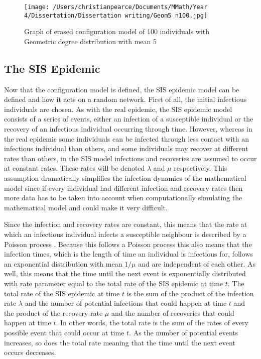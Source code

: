 \documentclass{uonmathsreport}
\begin{document}
\begin{figure}
\begin{center}
\texttt{[image: /Users/christianpearce/Documents/MMath/Year 4/Dissertation/Dissertation writing/Geom5 n100.jpg]}
\end{center}
\caption{Graph of erased configuration model of 100 individuals with Geometric degree distribution with mean 5}
\label{Geom5 n100}
\end{figure}

\subsection{The SIS Epidemic} \label{subsub:5.2}

Now that the configuration model is defined, the SIS epidemic model can be defined and how it acts on a random network. First of all, the initial infectious individuals are chosen. As with the real epidemic, the SIS epidemic model consists of a series of events, either an infection of a susceptible individual or the recovery of an infectious individual occurring through time. However, whereas in the real epidemic some individuals can be infected through less contact with an infectious individual than others, and some individuals may recover at different rates than others, in the SIS model infections and recoveries are assumed to occur at constant rates. These rates will be denoted $\lambda$ and $\mu$ respectively. This assumption dramatically simplifies the infection dynamics of the mathematical model since if every individual had different infection and recovery rates then more data has to be taken into account when computationally simulating the mathematical model and could make it very difficult.

Since the infection and recovery rates are constant, this means that the rate at which an infectious individual infects a susceptible neighbour is described by a Poisson process \cite{bibandersson3}. Because this follows a Poisson process this also means that the infection times, which is the length of time an individual is infectious for, follows an exponential distribution with mean $1/ \mu$ and are independent of each other. As well, this means that the time until the next event is exponentially distributed with rate parameter equal to the total rate of the SIS epidemic at time $t$. The total rate of the SIS epidemic at time $t$ is the sum of the product of the infection rate $\lambda$ and the number of potential infections that could happen at time $t$ and the product of the recovery rate $\mu$ and the number of recoveries that could happen at time $t$. In other words, the total rate is the sum of the rates of every possible event that could occur at time $t$. As the number of potential events increases, so does the total rate meaning that the time until the next event occurs decreases. 
\end{document}
